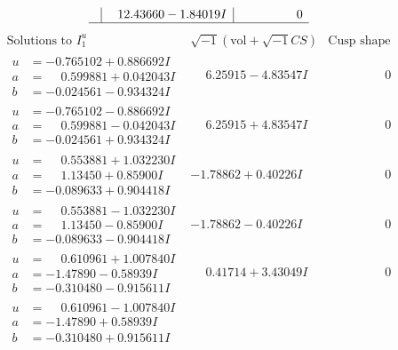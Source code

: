 \documentclass[1p]{elsarticle_modified}
\theoremstyle{definition}
\newcommand{\I}{\sqrt{-1}}
\begin{document}
$$\begin{array}{c|c|c}
 & \phantom{-}12.43660 - 1.84019 I & \phantom{-0.000000 } 0\\
 \hline 
 \end{array}$$\newpage$$\begin{array}{c|c|c}  
\text{Solutions to }I^u_{1}& \I (\text{vol} + \sqrt{-1}CS) & \text{Cusp shape}\\
 \hline 
\begin{aligned}
u &= -0.765102 + 0.886692 I \\
a &= \phantom{-}0.599881 + 0.042043 I \\
b &= -0.024561 - 0.934324 I\end{aligned}
 & \phantom{-}6.25915 - 4.83547 I & \phantom{-0.000000 } 0 \\ \hline\begin{aligned}
u &= -0.765102 - 0.886692 I \\
a &= \phantom{-}0.599881 - 0.042043 I \\
b &= -0.024561 + 0.934324 I\end{aligned}
 & \phantom{-}6.25915 + 4.83547 I & \phantom{-0.000000 } 0 \\ \hline\begin{aligned}
u &= \phantom{-}0.553881 + 1.032230 I \\
a &= \phantom{-}1.13450 + 0.85900 I \\
b &= -0.089633 + 0.904418 I\end{aligned}
 & -1.78862 + 0.40226 I & \phantom{-0.000000 } 0 \\ \hline\begin{aligned}
u &= \phantom{-}0.553881 - 1.032230 I \\
a &= \phantom{-}1.13450 - 0.85900 I \\
b &= -0.089633 - 0.904418 I\end{aligned}
 & -1.78862 - 0.40226 I & \phantom{-0.000000 } 0 \\ \hline\begin{aligned}
u &= \phantom{-}0.610961 + 1.007840 I \\
a &= -1.47890 - 0.58939 I \\
b &= -0.310480 - 0.915611 I\end{aligned}
 & \phantom{-}0.41714 + 3.43049 I & \phantom{-0.000000 } 0 \\ \hline\begin{aligned}
u &= \phantom{-}0.610961 - 1.007840 I \\
a &= -1.47890 + 0.58939 I \\
b &= -0.310480 + 0.915611 I\end{aligned}

\end{array}$$
\end{document}
